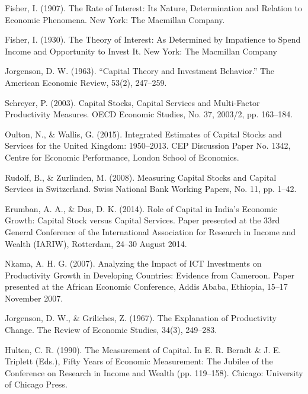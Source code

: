 \documentclass[12pt,a4paper,oneside]{report}
\begin{document}
\hangindent=1cm Fisher, I. (1907). The Rate of Interest: Its Nature, Determination and Relation to Economic Phenomena. New
York: The Macmillan Company.\par

\hangindent=1cm Fisher, I. (1930). The Theory of Interest: As Determined by Impatience to Spend Income and Opportunity to
Invest It. New York: The Macmillan Company\par

\hangindent=1cm Jorgenson, D. W. (1963). “Capital Theory and Investment Behavior.” The American Economic Review, 53(2),
247–259.\par

\hangindent=1cm Schreyer, P. (2003). Capital Stocks, Capital Services and Multi-Factor Productivity Measures. OECD Economic
Studies, No. 37, 2003/2, pp. 163–184.\par

\hangindent=1cm Oulton, N., \& Wallis, G. (2015). Integrated Estimates of Capital Stocks and Services for the United Kingdom:
1950–2013. CEP Discussion Paper No. 1342, Centre for Economic Performance, London School of Economics.\par

\hangindent=1cm Rudolf, B., \& Zurlinden, M. (2008). Measuring Capital Stocks and Capital Services in Switzerland. Swiss
National Bank Working Papers, No. 11, pp. 1–42.\par

\hangindent=1cm Erumban, A. A., \& Das, D. K. (2014). Role of Capital in India’s Economic Growth: Capital Stock versus Capital
Services. Paper presented at the 33rd General Conference of the International Association for Research in
Income and Wealth (IARIW), Rotterdam, 24–30 August 2014.\par

\hangindent=1cm Nkama, A. H. G. (2007). Analyzing the Impact of ICT Investments on Productivity Growth in Developing
Countries: Evidence from Cameroon. Paper presented at the African Economic Conference, Addis Ababa, Ethiopia,
15–17 November 2007.\par

\hangindent=1cm Jorgenson, D. W., \& Griliches, Z. (1967). The Explanation of Productivity Change. The Review of Economic
Studies, 34(3), 249–283.\par

\hangindent=1cm Hulten, C. R. (1990). The Measurement of Capital. In E. R. Berndt \& J. E. Triplett (Eds.), Fifty Years of
Economic Measurement: The Jubilee of the Conference on Research in Income and Wealth (pp. 119–158). Chicago:
University of Chicago Press.\par
\end{document}
